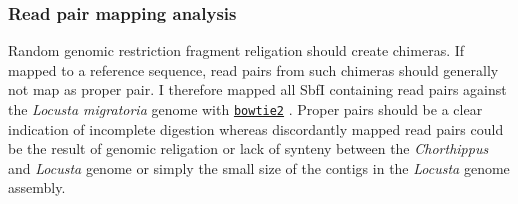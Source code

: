 \documentclass[a4paper,12pt,times,authoryear,twoside,print,index]{Classes/PhDThesisPSnPDF}\usepackage[]{graphicx}\usepackage[]{color}
\begin{document}
\FloatBarrier
\subsubsection{Read pair mapping analysis}

Random genomic restriction fragment religation should create chimeras. If mapped to a reference sequence, read pairs from such chimeras should generally not map as \gls{proper pair}. I therefore mapped all SbfI containing read pairs against the \textit{Locusta migratoria} genome \citep{Wang2014} with \href{http://bowtie-bio.sourceforge.net/bowtie2/index.shtml}{\texttt{bowtie2}} \citep{Langmead2012}. Proper pairs should be a clear indication of incomplete digestion whereas \gls{discordant}ly mapped read pairs could be the result of genomic religation or lack of synteny between the \textit{Chorthippus} and \textit{Locusta} genome or simply the small size of the contigs in the \textit{Locusta} genome assembly.
%
\end{document}
